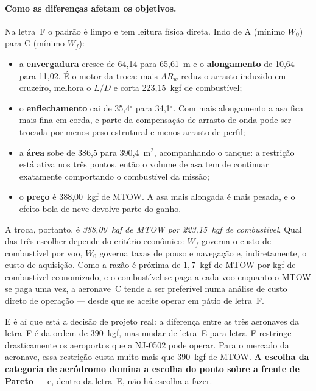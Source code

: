 \paragraph{Como as diferenças afetam os objetivos.}
Na letra~F o padrão é limpo e tem leitura física direta. Indo de A
(mínimo $W_0$) para C (mínimo $W_f$):
\begin{itemize}
\item a \textbf{envergadura} cresce de 64{,}14 para 65{,}61~m e o
      \textbf{alongamento} de 10{,}64 para 11{,}02. É o motor da
      troca: mais $AR_w$ reduz o arrasto induzido em cruzeiro, melhora o
      $L/D$ e corta 223{,}15~kgf de combustível;
\item o \textbf{enflechamento} cai de 35{,}4$^\circ$ para
      34{,}1$^\circ$. Com mais alongamento a asa fica mais fina em
      corda, e parte da compensação de arrasto de onda pode ser trocada
      por menos peso estrutural e menos arrasto de perfil;
\item a \textbf{área} sobe de 386{,}5 para 390{,}4~m$^2$,
      acompanhando o tanque: a restrição  está ativa
      nos três pontos, então o volume de asa tem de continuar exatamente
      comportando o combustível da missão;
\item o \textbf{preço} é 388{,}00~kgf de MTOW. A asa mais alongada é
      mais pesada, e o efeito bola de neve devolve parte do ganho.
\end{itemize}

A troca, portanto, é \emph{388{,}00~kgf de MTOW por
223{,}15~kgf de combustível}. Qual das três escolher depende do
critério econômico: $W_f$ governa o custo de combustível por voo, $W_0$
governa taxas de pouso e navegação e, indiretamente, o custo de
aquisição. Como a razão é próxima de $1{,}7$~kgf de MTOW por kgf de
combustível economizado, e o combustível se paga a cada voo enquanto o
MTOW se paga uma vez, a aeronave~C tende a ser preferível numa análise de
custo direto de operação --- desde que se aceite operar em pátio de
letra~F.

E é aí que está a decisão de projeto real: a diferença entre as três
aeronaves da letra~F é da ordem de $390$~kgf, mas mudar de letra~E para
letra~F restringe drasticamente os aeroportos que a NJ-0502 pode
operar. Para o mercado da aeronave, essa restrição custa muito mais que
$390$~kgf de MTOW. \textbf{A escolha da categoria de aeródromo domina a
escolha do ponto sobre a frente de Pareto} --- e, dentro da letra~E, não
há escolha a fazer.

